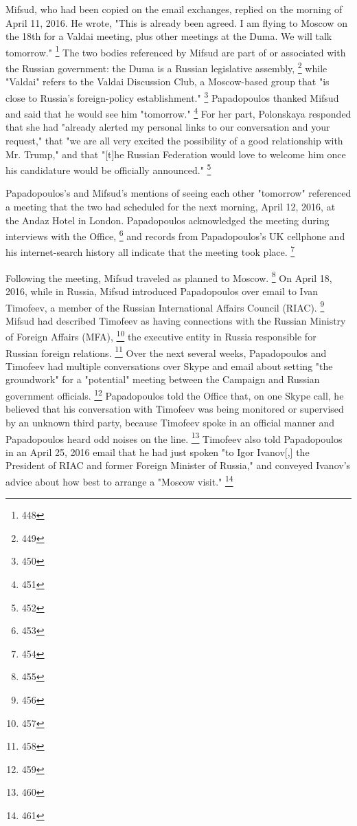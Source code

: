 Mifsud, who had been copied on the email exchanges, replied on the morning of April 11, 2016.
He wrote, "This is already been agreed.
I am flying to Moscow on the 18th for a Valdai meeting, plus other meetings at the Duma.
We will talk tomorrow."%
\footnote{448}
The two bodies referenced by Mifsud are part of or associated with the Russian government: the Duma is a Russian legislative assembly,%
\footnote{449}
while "Valdai" refers to the Valdai Discussion Club, a Moscow-based group that "is close to Russia's foreign-policy establishment."%
\footnote{450}
Papadopoulos thanked Mifsud and said that he would see him "tomorrow."%
\footnote{451}
For her part, Polonskaya responded that she had "already alerted my personal links to our conversation and your request," that "we are all very excited the possibility of a good relationship with Mr. Trump," and that "[t]he Russian Federation would love to welcome him once his candidature would be officially announced."%
\footnote{452}

Papadopoulos's and Mifsud's mentions of seeing each other "tomorrow" referenced a meeting that the two had scheduled for the next morning, April 12, 2016, at the Andaz Hotel in London.
Papadopoulos acknowledged the meeting during interviews with the Office,%
\footnote{453}
and records from Papadopoulos's UK cellphone and his internet-search history all indicate that the meeting took place.%
\footnote{454}

Following the meeting, Mifsud traveled as planned to Moscow.%
\footnote{455}
On April 18, 2016, while in Russia, Mifsud introduced Papadopoulos over email to Ivan Timofeev, a member of the Russian International Affairs Council (RIAC).%
\footnote{456}
Mifsud had described Timofeev as having connections with the Russian Ministry of Foreign Affairs (MFA),%
\footnote{457}
the executive entity in Russia responsible for Russian foreign relations.%
\footnote{458}
Over the next several weeks, Papadopoulos and Timofeev had multiple conversations over Skype and email about setting "the groundwork" for a "potential" meeting between the Campaign and Russian government officials.%
\footnote{459}
Papadopoulos told the Office that, on one Skype call, he believed that his conversation with Timofeev was being monitored or supervised by an unknown third party, because Timofeev spoke in an official manner and Papadopoulos heard odd noises on the line.%
\footnote{460}
Timofeev also told Papadopoulos in an April 25, 2016 email that he had just spoken "to Igor Ivanov[,] the President of RIAC and former Foreign Minister of Russia," and conveyed Ivanov's advice about how best to arrange a "Moscow visit."%
\footnote{461}

